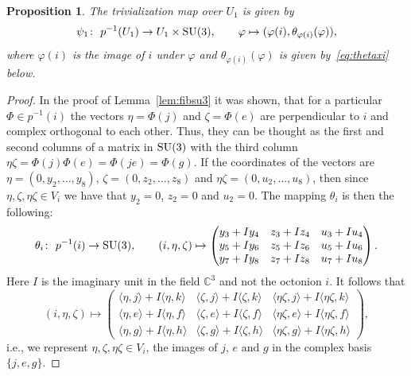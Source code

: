 \documentclass[10pt,a4paper]{amsart}
\numberwithin{equation}{section}
\newtheorem{Proposition}[Theorem]{Proposition}
 { \theoremstyle{definition}
\newtheorem{Definition}[Theorem]{Definition}
\newtheorem{Remark}[Theorem]{Remark} }
\newcommand{\SC}{\mathbb{C}} %
\begin{document}
\begin{Proposition} \label{prop:trivn} The trivialization map over $U_1$ is given by
 \[\psi_1\colon \ p^{-1}(U_1) \rightarrow U_1 \times {\rm SU}(3), \qquad \varphi \mapsto (\varphi(i),\theta_{\varphi(i)}(\varphi) ),\]
 where $\varphi(i)$ is the image of $i$ under $\varphi$ and $\theta_{\varphi(i)}(\varphi)$ is given by~\eqref{eq:thetaxi} below.
\end{Proposition}
\begin{proof}In the proof of Lemma~\ref{lem:fibsu3} it was shown, that
 for a particular $\Phi \in p^{-1}(i)$ the vectors $\eta=\Phi(j)$ and $\zeta=\Phi(e)$ are perpendicular to $i$ and complex orthogonal to each other. Thus, they can be thought as the first and second columns of a matrix in ${\rm SU}(3)$ with the third column $\eta\zeta=\Phi(j)\Phi(e)=\Phi(je)=\Phi(g)$. %
 If the coordinates of the vectors are $\eta=(0,y_2,\dots,y_8)$, $\zeta=(0,z_2,\dots,z_8)$ and $\eta \zeta = (0,u_2,\dots,u_8)$, then since $\eta,\zeta,\eta\zeta \in V_i$ we have that $y_2=0$, $z_2=0$ and $u_2=0$. The mapping $\theta_{i}$ is then the following:
 \[\theta_i\colon \ p^{-1}(i) \rightarrow {\rm SU}(3), \qquad (i,\eta,\zeta) \mapsto
 \begin{pmatrix}
 y_3+Iy_4 & z_3+Iz_4 & u_3+Iu_4\\
 y_5+Iy_6 & z_5+Iz_6 & u_5+Iu_6\\
 y_7+Iy_8 & z_7+Iz_8 & u_7+Iu_8
 \end{pmatrix}.\]
 Here $I$ is the imaginary unit in the field $\SC^3$ and not the octonion $i$.
 It follows that
 \[ (i,\eta,\zeta) \mapsto
 \begin{pmatrix}
 \langle \eta,j \rangle + I\langle \eta,k \rangle & \langle \zeta,j \rangle + I\langle \zeta,k \rangle & \langle \eta \zeta,j \rangle + I\langle \eta \zeta,k \rangle\\
 \langle \eta,e \rangle +I\langle \eta,f \rangle & \langle \zeta,e \rangle +I\langle \zeta,f \rangle & \langle \eta \zeta,e \rangle +I\langle \eta \zeta,f \rangle\\
 \langle \eta,g \rangle +I\langle \eta,h \rangle & \langle \zeta,g \rangle +I\langle \zeta,h \rangle & \langle \eta \zeta,g \rangle +I\langle \eta \zeta,h \rangle
 \end{pmatrix},
 \]
 i.e., we represent $\eta,\zeta,\eta\zeta \in V_i$, the images of $j$, $e$ and $g$ in the complex basis $\{j,e,g\}$.


\end{proof}
\end{document}
